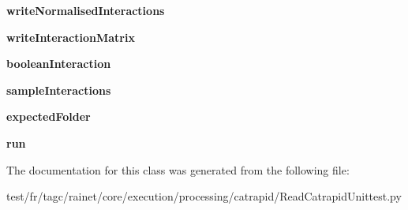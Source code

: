 \begin{DoxyCompactItemize}
\item 
\hypertarget{classReadCatrapidUnittest_1_1ReadCatrapidUnittest_ac3b578d4c07493f50642163536f38d85}{{\bfseries write\-Normalised\-Interactions}}\label{classReadCatrapidUnittest_1_1ReadCatrapidUnittest_ac3b578d4c07493f50642163536f38d85}

\item 
\hypertarget{classReadCatrapidUnittest_1_1ReadCatrapidUnittest_a57635292f47a323db723e97f92abcb70}{{\bfseries write\-Interaction\-Matrix}}\label{classReadCatrapidUnittest_1_1ReadCatrapidUnittest_a57635292f47a323db723e97f92abcb70}

\item 
\hypertarget{classReadCatrapidUnittest_1_1ReadCatrapidUnittest_a400fbc023fccc2cf58c7269432b284ac}{{\bfseries boolean\-Interaction}}\label{classReadCatrapidUnittest_1_1ReadCatrapidUnittest_a400fbc023fccc2cf58c7269432b284ac}

\item 
\hypertarget{classReadCatrapidUnittest_1_1ReadCatrapidUnittest_ab6629d2e6bbd89b6a6aea05d1335c994}{{\bfseries sample\-Interactions}}\label{classReadCatrapidUnittest_1_1ReadCatrapidUnittest_ab6629d2e6bbd89b6a6aea05d1335c994}

\item 
\hypertarget{classReadCatrapidUnittest_1_1ReadCatrapidUnittest_a6ab6c71e76f8cd057c61ba13c0b9c5e0}{{\bfseries expected\-Folder}}\label{classReadCatrapidUnittest_1_1ReadCatrapidUnittest_a6ab6c71e76f8cd057c61ba13c0b9c5e0}

\item 
\hypertarget{classReadCatrapidUnittest_1_1ReadCatrapidUnittest_ac25767144dacdb7b451d1ae816484e78}{{\bfseries run}}\label{classReadCatrapidUnittest_1_1ReadCatrapidUnittest_ac25767144dacdb7b451d1ae816484e78}

\end{DoxyCompactItemize}


The documentation for this class was generated from the following file\-:\begin{DoxyCompactItemize}
\item 
test/fr/tagc/rainet/core/execution/processing/catrapid/Read\-Catrapid\-Unittest.\-py\end{DoxyCompactItemize}
